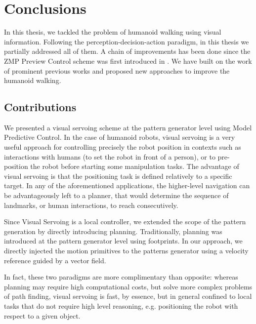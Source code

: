 
\chapter{Conclusions}
\label{Chap:Conclusions}

In this thesis, we tackled the problem of humanoid walking using visual information. Following the perception-decision-action paradigm, in this thesis we partially addressed all of them. A chain of improvements has been done since the ZMP Preview Control scheme was first introduced in \citep{Kajita2003}. We have built on the work of prominent previous works and proposed new approaches to improve the humanoid walking.

\section{Contributions}

We presented a visual servoing scheme at the pattern generator level using Model Predictive Control. In the case of humanoid robots, visual servoing is a very useful approach for controlling precisely the robot position in contexts such as interactions with humans (to set the robot in front of a person), or to pre-position the robot before starting some manipulation tasks. The advantage of visual servoing is that the positioning task is defined relatively to a specific target. In any of the aforementioned applications, the higher-level navigation can be advantageously left to a planner, that would determine the sequence of landmarks, or human interactions, to reach consecutively. 

Since Visual Servoing is a local controller, we extended the scope of the pattern generation by directly introducing planning. Traditionally, planning was introduced at the pattern generator level using footprints. In our approach, we directly injected the motion primitives to the patterns generator using a velocity reference guided by a vector field.

In fact, these two paradigms are more complimentary than opposite: whereas planning may require high computational costs, but solve more complex problems of path finding, visual servoing is fast, by essence, but in general confined to local tasks that do not require high level reasoning, e.g. positioning the robot with respect to a given object.

